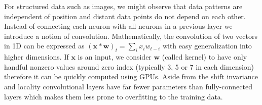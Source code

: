 For structured data such as images, we might observe that data patterns are independent of position and distant data points do not depend on each other. Instead of connecting each neuron with all neurons in a previous layer we introduce a notion of convolution. Mathematically, the convolution of two vectors in 1D can be expressed as $(\bm{x}*\bm{w})_t=\sum_i x_i w_{t-i}$ with easy generalization into higher dimensions. If $\bm{x}$ is an input, we consider $\bm{w}$ (called kernel) to have only handful nonzero values around zero index (typically 3, 5 or 7 in each dimension) therefore it can be quickly computed using GPUs. Aside from the shift invariance and locality convolutional layers have far fewer parameters than fully-connected layers which makes them less prone to overfitting to the training data.






